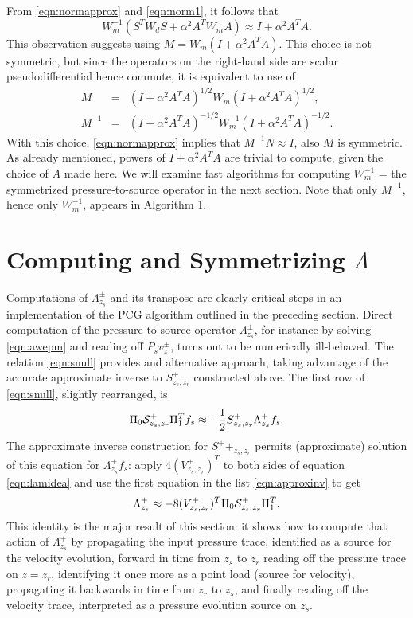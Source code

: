 From \ref{eqn:normapprox} and \ref{eqn:norm1}, it follows that
\[
  W_m^{-1}(S^TW_dS + \alpha^2 A^TW_mA) \approx I + \alpha^2 A^TA.
\]
This observation suggests using $M=W_m(I+\alpha^2A^TA)$. This choice
is not symmetric, but since the operators on the right-hand side are
scalar pseudodifferential hence commute, it is equivalent to use of
\begin{eqnarray}
  M         &=&(I+\alpha^2A^TA)^{1/2}W_m(I+\alpha^2A^TA)^{1/2},\nonumber \\
  M^{-1}
            &=&(I+\alpha^2A^TA)^{-1/2}W_m^{-1}(I+\alpha^2A^TA)^{-1/2}.
                \label{eqn:defprecond}
\end{eqnarray}
With this choice, \ref{eqn:normapprox} implies that
$M^{-1}N \approx I$, also $M$ is symmetric. As already mentioned,
powers of $I + \alpha^2A^TA$ are trivial to compute, given the choice
of $A$ made here. We will examine fast algorithms for computing
$W_m^{-1}$ = the symmetrized pressure-to-source operator in the next
section. Note that only $M^{-1}$, hence only $W_m^{-1}$, appears in
Algorithm 1.


\section{Computing and Symmetrizing $\Lambda$}

Computations of $\Lambda^{\pm}_{z_s}$ and its transpose are clearly critical steps in an
implementation of the PCG algorithm outlined in the preceding section.
Direct computation of the pressure-to-source operator $\Lambda^{\pm}_{z_s}$, for instance by solving
\ref{eqn:awepm} and reading off $P_sv^{\pm}_{z}$, turns out to be
numerically ill-behaved. The relation \ref{eqn:snull} provides and
alternative approach, taking advantage of the accurate approximate
inverse to $S^+_{z_s,z_r}$ constructed above. The first row of
\ref{eqn:snull}, slightly rearranged, is
\begin{equation}
  \label{eqn:lamidea}
  \Pi_0{\cal S}^+_{z_s,z_r}\Pi_1^T f_s \approx  -\frac{1}{2} S^+_{z_s,z_r}\Lambda^+_{z_s}f_s.
\end{equation}
The approximate inverse construction for $S^++_{z_s,z_r}$ permits (approximate)
solution of this equation for $\Lambda^+_{z_s}f_s$: apply
$4(V^{+}_{z_s,z_r})^T$ to both sides of equation \ref{eqn:lamidea} and
use the first equation in the list \ref{eqn:approxinv} to get
\begin{equation}
  \label{eqn:lamident}
  \Lambda^+_{z_s} \approx -8(V^{+}_{z_s,z_r})^T\Pi_0 {\cal S}^+_{z_s,z_r}\Pi_1^T.
\end{equation}
This identity is the major result of this section: it shows how
to compute that action of $\Lambda^+_{z_s}$ by propagating the input
pressure trace, identified as a source for the velocity evolution,
forward in time from $z_s$ to $z_r$
reading off the pressure trace on $z=z_r$, identifying it once more as
a point load (source for velocity), propagating it backwards in time from $z_r$ to
$z_s$, and finally reading off the velocity trace, interpreted as a
pressure evolution source on $z_s$. 

